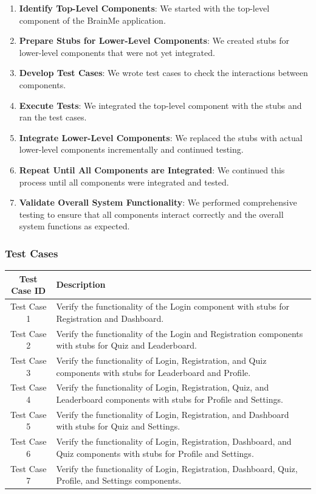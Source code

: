 \begin{enumerate}
\item \textbf{Identify Top-Level Components}: We started with the top-level component of the BrainMe application.
\item \textbf{Prepare Stubs for Lower-Level Components}: We created stubs for lower-level components that were not yet integrated.
\item \textbf{Develop Test Cases}: We wrote test cases to check the interactions between components.
\item \textbf{Execute Tests}: We integrated the top-level component with the stubs and ran the test cases.
\item \textbf{Integrate Lower-Level Components}: We replaced the stubs with actual lower-level components incrementally and continued testing.
\item \textbf{Repeat Until All Components are Integrated}: We continued this process until all components were integrated and tested.
\item \textbf{Validate Overall System Functionality}: We performed comprehensive testing to ensure that all components interact correctly and the overall system functions as expected.
\end{enumerate}

\subsubsection{Test Cases}

\begin{longtable}{|c|p{10cm}|}
\hline
\textbf{Test Case ID} & \textbf{Description} \\
\hline
Test Case 1 & Verify the functionality of the Login component with stubs for Registration and Dashboard. \\
\hline
Test Case 2 & Verify the functionality of the Login and Registration components with stubs for Quiz and Leaderboard. \\
\hline
Test Case 3 & Verify the functionality of Login, Registration, and Quiz components with stubs for Leaderboard and Profile. \\
\hline
Test Case 4 & Verify the functionality of Login, Registration, Quiz, and Leaderboard components with stubs for Profile and Settings. \\
\hline
Test Case 5 & Verify the functionality of Login, Registration, and Dashboard with stubs for Quiz and Settings. \\
\hline
Test Case 6 & Verify the functionality of Login, Registration, Dashboard, and Quiz components with stubs for Profile and Settings. \\
\hline
Test Case 7 & Verify the functionality of Login, Registration, Dashboard, Quiz, Profile, and Settings components. \\
\hline
\end{longtable}

